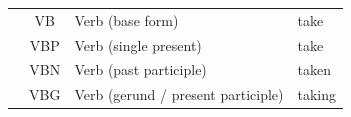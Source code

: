 \documentclass[smallextended,natbib]{svjour3}       %
\begin{document}
\begin{table}[ht]
{\begin{tabular}{|c|c|l|l|}
                                             & VB  & Verb (base form)                   & take                                           \\ \cline{2-4} 
                                             & VBP & Verb (single present)              & take                                           \\ \cline{2-4} 
                                             & VBN & Verb (past participle)             & taken                                          \\ \cline{2-4} 
                                             & VBG & Verb (gerund / present participle) & taking                                         \\ \hline
        \end{tabular}%
        }
    \end{table}
\end{document}

